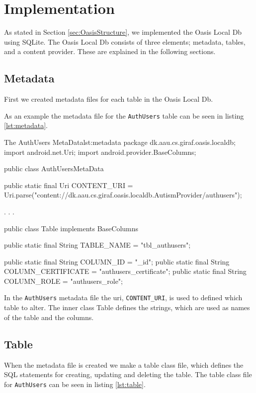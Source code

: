 \section{Implementation}
\label{sec:dbImp}
As stated in Section \vref{sec:OasisStructure}, we implemented the Oasis Local Db using SQLite.
The Oasis Local Db consists of three elements; metadata, tables, and a content provider.
These are explained in the following sections.

\subsection{Metadata}
First we created metadata files for each table in the Oasis Local Db.

As an example the metadata file for the \texttt{AuthUsers} table can be seen in listing \vref{lst:metadata}.

\begin{Java}{The AuthUsers MetaData}{lst:metadata}
package dk.aau.cs.giraf.oasis.localdb;
import android.net.Uri;
import android.provider.BaseColumns;

public class AuthUsersMetaData {

	public static final Uri CONTENT_URI = Uri.parse("content://dk.aau.cs.giraf.oasis.localdb.AutismProvider/authusers");

	.
	.
	.
	
	public class Table implements BaseColumns {
		public static final String TABLE_NAME = "tbl_authusers";

		public static final String COLUMN_ID = "_id";
		public static final String COLUMN_CERTIFICATE = "authusers_certificate";
		public static final String COLUMN_ROLE = "authusers_role";
	}
}
\end{Java}

In the \texttt{AuthUsers} metadata file the uri, \texttt{CONTENT\_URI}, is used to defined which table to alter. 
The inner class Table defines the strings, which are used as names of the table and the columns.

\subsection{Table}
When the metadata file is created we make a table class file, which defines the SQL statements for creating, updating and deleting the table. The table class file for \texttt{AuthUsers} can be seen in listing \vref{lst:table}.

